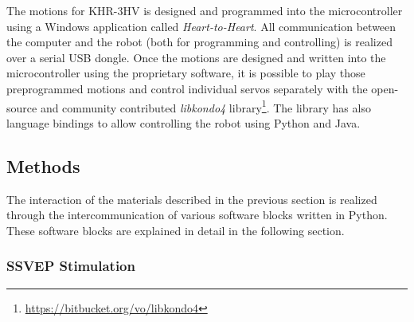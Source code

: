 \documentclass[12pt]{article}
\newcommand\mysubsection[1]{\subsection{#1}}
\newcommand\mysubsubsection[1]{\subsubsection{#1}}
\numberwithin{equation}{section}
\numberwithin{figure}{section}
\numberwithin{table}{section}
\begin{document}
\par{
    The motions for KHR-3HV is designed and programmed into the microcontroller
    using a Windows application called \emph{Heart-to-Heart}. All communication
    between the computer and the robot (both for programming and controlling)
    is realized over a serial USB dongle. Once the motions are designed and written
    into the microcontroller using the proprietary software,
    it is possible to play those preprogrammed motions and
    control individual servos separately with the open-source and community
    contributed \emph{libkondo4} library\footnote{\url{https://bitbucket.org/vo/libkondo4}}.
    The library has also language bindings to allow controlling the robot using Python and Java.
}


\mysubsection{Methods}
\par{
    The interaction of the materials described in the previous section
    is realized through the intercommunication of various software blocks
    written in Python. These software blocks are explained in detail
    in the following section.
}

\mysubsubsection{SSVEP Stimulation}
\end{document}
